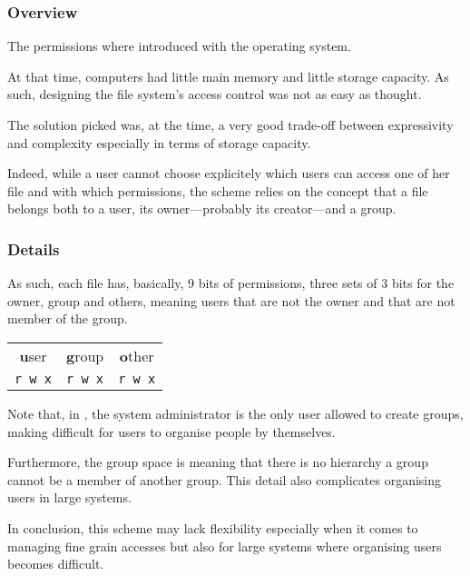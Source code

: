 
\begin{frame}
  \frametitle{Overview}

  The  permissions where introduced with the 
  operating system.

  \-

  At that time, computers had little main memory and little storage capacity.
  As such, designing the file system's access control was not as easy as
  thought.

  \-

  The solution picked was, at the time, a very good trade-off between
  expressivity and complexity especially in terms of storage capacity.

  \-

  Indeed, while a user cannot choose explicitely which users can access one of
  her file and with which permissions, the  scheme relies on the
  concept that a file belongs both to a user, its owner---probably its
  creator---and a group.
\end{frame}


\begin{frame}[containsverbatim]
  \frametitle{Details}

  As such, each file has, basically, $9$ bits of permissions, three sets of
  $3$ bits  for the owner, group and others, meaning users that are
  not the owner and that are not member of the group.

  \begin{center}
    \begin{tabular}{ccc}
      \textbf{u}ser & \textbf{g}roup & \textbf{o}ther \\
      \verb|r w x| & \verb|r w x| & \verb|r w x| \\
    \end{tabular}
  \end{center}

  Note that, in , the system administrator is the only user allowed
  to create groups, making difficult for users to organise people by
  themselves.

  \-

  Furthermore, the group space is  meaning that there is no
  hierarchy \ie{} a group cannot be a member of another group. This detail
  also complicates organising users in large systems.

  \-

  In conclusion, this scheme may lack flexibility especially when it comes to
  managing fine grain accesses but also for large systems where organising
  users becomes difficult.
\end{frame}

